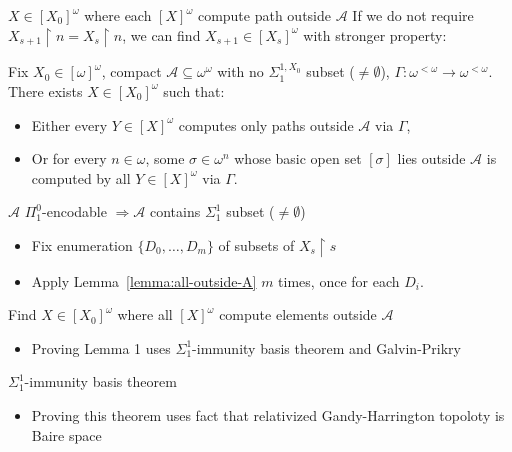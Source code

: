 \begin{frame}{$X\in[X_0]^\omega$ where each {$[X]^\omega$} compute
path outside $\mathcal{A}$}
  If we do not require $X_{s+1}\restriction n=X_s\restriction n$, we can
  find $X_{s+1}\in[X_s]^\omega$ with stronger property:

  \begin{lemma}
  \label{lemma:all-outside-A}
    Fix $X_0\in[\omega]^\omega$, compact
    $\mathcal{A}\subseteq\omega^\omega$ with no $\Sigma_1^{1,X_0}$ subset
    ($\neq\emptyset$), $\Gamma:\omega^{<\omega} \rightarrow
    \omega^{<\omega}$. There exists $X\in[X_0]^\omega$ such that:

    \begin{itemize}
      \item Either every $Y\in[X]^\omega$ computes only paths outside
        $\mathcal{A}$ via $\Gamma$,
      \item Or for every $n\in\omega$, some $\sigma\in\omega^n$ whose basic
        open set $[\sigma]$ lies outside $\mathcal{A}$ is computed by all
        $Y\in[X]^\omega$ via $\Gamma$.
    \end{itemize}
  \end{lemma}
\end{frame}

\begin{frame}{$\mathcal{A}$ $\Pi_1^0$-encodable $\Rightarrow \mathcal{A}$
contains $\Sigma_1^1$ subset ($\neq\emptyset$)}
  \begin{itemize}
      \item Fix enumeration $\{D_0,\ldots,D_m\}$ of subsets of
        $X_s\restriction s$

      \item Apply Lemma~\ref{lemma:all-outside-A} $m$ times, once for
        each $D_i$.
  \end{itemize}
\end{frame}

\begin{frame}{Find $X\in[X_0]^\omega$ where all {$[X]^\omega$} compute
elements outside $\mathcal{A}$}
  \begin{itemize}
    \item Proving Lemma 1 uses $\Sigma_1^1$-immunity basis theorem and
      Galvin-Prikry
  \end{itemize}
\end{frame}

\begin{frame}{$\Sigma_1^1$-immunity basis theorem}
  \begin{itemize}
    \item Proving this theorem uses fact that relativized Gandy-Harrington
      topoloty is Baire space
  \end{itemize}
\end{frame}

